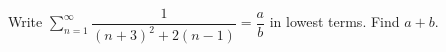 Write $\displaystyle\sum_{n=1}^{\infty}\dfrac{1}{(n+3)^2+2(n-1)}=\dfrac{a}{b}$ in lowest terms. Find $a+b$.
